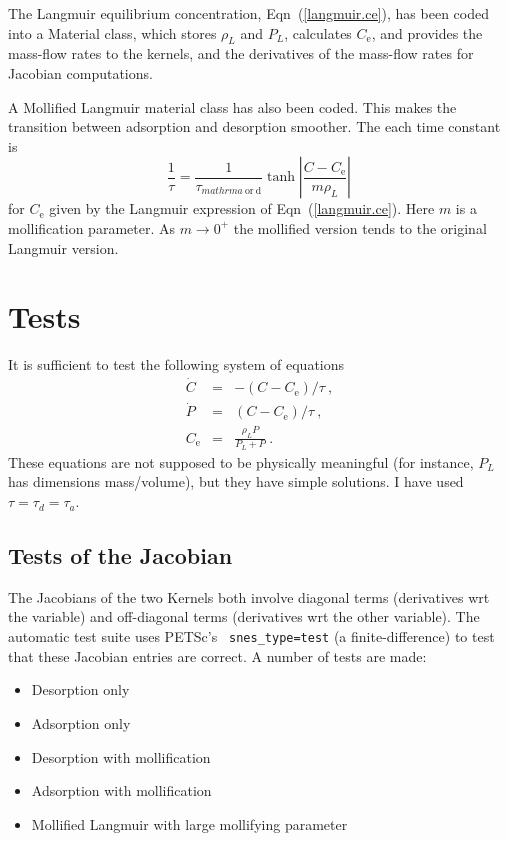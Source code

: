 \documentclass[]{scrreprt}
\begin{document}
The Langmuir equilibrium concentration, Eqn~(\ref{langmuir.ce}), has
been coded into a Material class, which stores $\rho_{L}$ and $P_{L}$,
calculates $C_{\mathrm{e}}$, and provides the mass-flow rates to the
kernels, and the derivatives of the mass-flow rates for Jacobian
computations.

A Mollified Langmuir material class has also been coded.  This makes
the transition between adsorption and desorption smoother.  The each
time constant is
\begin{equation}
\frac{1}{\tau} = \frac{1}{\tau_{mathrm{a}\ \mathrm{or}\ \mathrm{d}}}
\tanh \left| \frac{C-C_{\mathrm{e}}}{m\rho_{L}}\right| \,
\end{equation}
for $C_{\mathrm{e}}$ given by the Langmuir expression of
Eqn~(\ref{langmuir.ce}).
Here $m$ is a mollification parameter.  As $m \rightarrow 0^{+}$ the
mollified version tends to the original Langmuir version.



\chapter{Tests}

It is sufficient to test the following system of equations
\begin{eqnarray}
\dot{C} & = & -(C-C_{\mathrm{e}})/\tau \ , \nonumber \\
\dot{P} & = & (C-C_{\mathrm{e}})/\tau \ , \nonumber \\
C_{\mathrm{e}} & = & \frac{\rho_{L}P}{P_{L}+P} \ .
\label{test.eqns}
\end{eqnarray}
These equations are not supposed to be physically meaningful (for
instance, $P_{L}$ has dimensions mass/volume), but they have simple
solutions.  I have used $\tau = \tau_{d} = \tau_{a}$.

\section{Tests of the Jacobian}

The Jacobians of the two Kernels both involve diagonal terms
(derivatives wrt the variable) and off-diagonal terms (derivatives wrt
the other variable).  The automatic test suite uses PETSc's {\tt
  snes\_type=test} (a finite-difference) to test that these Jacobian
entries are correct.  A number of tests are made:
\begin{itemize}
\item Desorption only
\item Adsorption only
\item Desorption with mollification
\item Adsorption with mollification
\item Mollified Langmuir with large mollifying parameter
\end{itemize}
\end{document}

